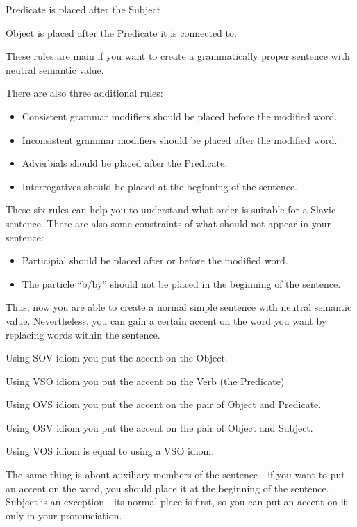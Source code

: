 Predicate is placed after the Subject

Object is placed after the Predicate it is connected to.

These rules are main if you want to create a grammatically proper sentence with neutral semantic value. 

There are also three additional rules:

\begin{itemize}
	\item Consistent grammar modifiers should be placed before the modified word.
	\item Inconsistent grammar modifiers should be placed after the modified word.
	\item Adverbials should be placed after the Predicate.
	\item Interrogatives should be placed at the beginning of the sentence.
\end{itemize}

These six rules can help you to understand what order is suitable for a Slavic sentence. There are also some constraints of what should not appear in your sentence:

\begin{itemize}
	\item Participial should be placed after or before the modified word.
	\item The particle “b/by” should not be placed in the beginning of the sentence.
\end{itemize}

Thus, now you are able to create a normal simple sentence with neutral semantic value. Nevertheless, you can gain a certain accent on the word you want by replacing words within the sentence.

Using SOV idiom you put the accent on the Object. 

Using VSO idiom you put the accent on the Verb (the Predicate)

Using OVS idiom you put the accent on the pair of Object and Predicate.

Using OSV idiom you put the accent on the pair of Object and Subject.

Using VOS idiom is equal to using a VSO idiom.

The same thing is about auxiliary members of the sentence - if you want to put an accent on the word, you should place it at the beginning of the sentence. Subject is an exception - its normal place is first, so you can put an accent on it only in your pronunciation.

